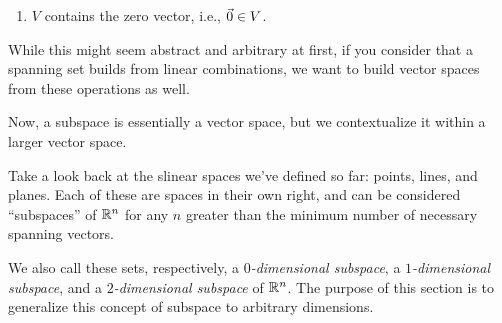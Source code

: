 \documentclass{ximera}
\begin{document}
\begin{exploration}
\begin{definition}
\begin{enumerate}
      \item $V$ contains the zero vector, i.e., $\vec{0}\in V$.
    \end{enumerate}

  \end{definition}

  While this might seem abstract and arbitrary at first, if you consider that a spanning set builds from linear combinations, we want to build vector spaces from these operations as well.

  Now, a subspace is essentially a vector space, but we contextualize it within a larger vector space.

Take a look back at the slinear spaces we've defined so far: points, lines, and planes. Each of these are spaces in their own right, and can be considered ``subspaces'' of $\mathbb{R}^n$ for any $n$ greater than the minimum number of necessary spanning vectors.

\begin{center}
\end{center}
We also call these sets, respectively, a {\em $0$-dimensional
  subspace}, a {\em $1$-dimensional subspace}, and a {\em
  $2$-dimensional subspace} of\/ $\mathbb{R}^n$. The purpose of this section is
to generalize this concept of subspace to arbitrary dimensions.


\end{exploration}
\end{document}
